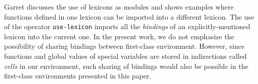 Garret discusses the use of lexicons as modules and shows examples
where functions defined in one lexicon can be imported into a
different lexicon.  The use of the operator \texttt{use-lexicon}
imports all the \emph{bindings} of an explicitly-mentioned lexicon
into the current one.  In the present work, we do not emphasize the
possibility of sharing bindings between first-class environment.
However, since functions and global values of special variables are
stored in indirections called \emph{cells} in our environment, such
sharing of bindings would also be possible in the first-class
environments presented in this paper.
